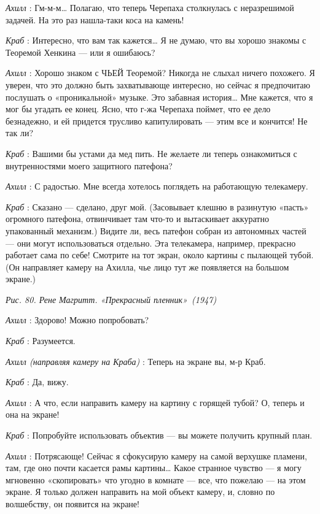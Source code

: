 \emph{Ахилл} : Гм-м-м\ldots{} Полагаю, что теперь Черепаха столкнулась с неразрешимой задачей. На это раз нашла-таки коса на камень!

\emph{Краб} : Интересно, что вам так кажется\ldots{} Я не думаю, что вы хорошо знакомы с Теоремой Хенкина --- или я ошибаюсь?

\emph{Ахилл} : Хорошо знаком с ЧЬЕЙ Теоремой? Никогда не слыхал ничего похожего. Я уверен, что это должно быть захватывающе интересно, но сейчас я предпочитаю послушать о «проникальной» музыке. Это забавная история\ldots{} Мне кажется, что я мог бы угадать ее конец. Ясно, что г-жа Черепаха поймет, что ее дело безнадежно, и ей придется трусливо капитулировать --- этим все и кончится! Не так ли?

\emph{Краб} : Вашими бы устами да мед пить. Не желаете ли теперь ознакомиться с внутренностями моего защитного патефона?

\emph{Ахилл} : С радостью. Мне всегда хотелось поглядеть на работающую телекамеру.

\emph{Краб} : Сказано --- сделано, друг мой. (Засовывает клешню в разинутую «пасть» огромного патефона, отвинчивает там что-то и вытаскивает аккуратно упакованный механизм.) Видите ли, весь патефон собран из автономных частей --- они могут использоваться отдельно. Эта телекамера, например, прекрасно работает сама по себе! Смотрите на тот экран, около картины с пылающей тубой. (Он направляет камеру на Ахилла, чье лицо тут же появляется на большом экране.)

\emph{Рис. 80. Рене Магритт. «Прекрасный пленник»~(1947)}

\emph{Ахилл} : Здорово! Можно попробовать?

\emph{Краб} : Разумеется.

\emph{Ахилл (направляя камеру на Краба)} : Теперь на экране вы, м-р Краб.

\emph{Краб} : Да, вижу.

\emph{Ахилл} : А что, если направить камеру на картину с горящей тубой? О, теперь и она на экране!

\emph{Краб} : Попробуйте использовать объектив --- вы можете получить крупный план.

\emph{Ахилл} : Потрясающе! Сейчас я сфокусирую камеру на самой верхушке пламени, там, где оно почти касается рамы картины\ldots{} Какое странное чувство --- я могу мгновенно «скопировать» что угодно в комнате --- все, что пожелаю --- на этом экране. Я только должен направить на мой объект камеру, и, словно по волшебству, он появится на экране!

